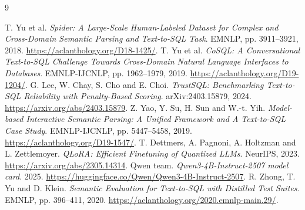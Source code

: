 \documentclass[11pt,a4paper]{article}
\begin{document}
\clearpage
\begin{thebibliography}{9}
\raggedright
{} T. Yu et al. \emph{Spider: A Large-Scale Human-Labeled Dataset for Complex and Cross-Domain
Semantic Parsing and Text-to-SQL Task}. EMNLP, pp. 3911--3921, 2018.
\url{https://aclanthology.org/D18-1425/}.
 T. Yu et al. \emph{CoSQL: A Conversational Text-to-SQL Challenge Towards Cross-Domain Natural
Language Interfaces to Databases}. EMNLP-IJCNLP, pp. 1962--1979, 2019.
\url{https://aclanthology.org/D19-1204/}.
 G. Lee, W. Chay, S. Cho and E. Choi.
\emph{TrustSQL: Benchmarking Text-to-SQL Reliability with Penalty-Based Scoring}.
arXiv:2403.15879, 2024. \url{https://arxiv.org/abs/2403.15879}.
 Z. Yao, Y. Su, H. Sun and W.-t. Yih.
\emph{Model-based Interactive Semantic Parsing: A Unified Framework and A Text-to-SQL Case Study}.
EMNLP-IJCNLP, pp. 5447--5458, 2019. \url{https://aclanthology.org/D19-1547/}.
 T. Dettmers, A. Pagnoni, A. Holtzman and L. Zettlemoyer.
\emph{QLoRA: Efficient Finetuning of Quantized LLMs}. NeurIPS, 2023.
\url{https://arxiv.org/abs/2305.14314}.
 Qwen team. \emph{Qwen3-4B-Instruct-2507 model card}.
2025. \url{https://huggingface.co/Qwen/Qwen3-4B-Instruct-2507}.
 R. Zhong, T. Yu and D. Klein.
\emph{Semantic Evaluation for Text-to-SQL with Distilled Test Suites}.
EMNLP, pp. 396--411, 2020. \url{https://aclanthology.org/2020.emnlp-main.29/}.
\end{thebibliography}
\end{document}
